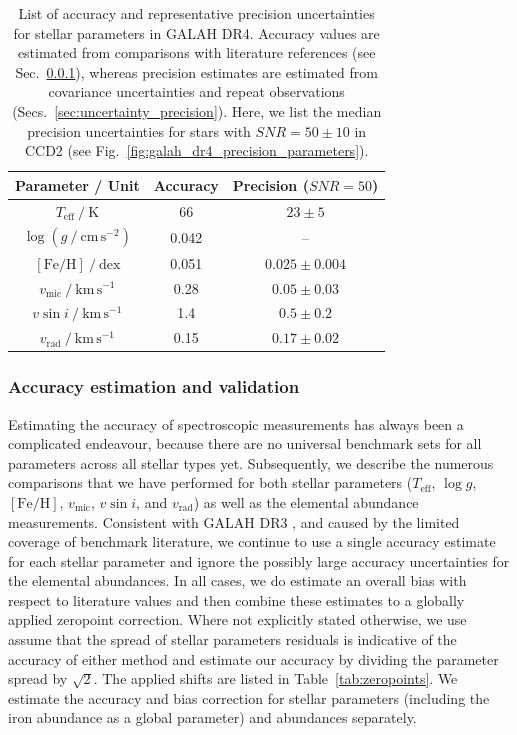\documentclass[
  journal=pasa,
  manuscript=research-paper, %
  year=2024,
  volume=37
]{cup-journal}
\newcommand{\Teff}{$T_\mathrm{eff}$\xspace}
\newcommand{\logg}{$\log g$\xspace}
\newcommand{\feh}{$\mathrm{[Fe/H]}$\xspace}
\newcommand{\vmic}{$v_\mathrm{mic}$\xspace}
\newcommand{\vsini}{$v \sin i$\xspace}
\newcommand{\vrad}{$v_\mathrm{rad}$\xspace}
\begin{document}
\begin{table}[ht]
\centering
\caption{List of accuracy and representative precision uncertainties for stellar parameters in GALAH DR4. Accuracy values are estimated from comparisons with literature references (see Sec.~\ref{sec:uncertainty_accuracy}), whereas precision estimates are estimated from covariance uncertainties and repeat observations (Secs.~\ref{sec:uncertainty_precision}). Here, we list the median precision uncertainties for stars with $SNR = 50 \pm 10$ in CCD2 (see Fig.~\ref{fig:galah_dr4_precision_parameters}).}
\label{tab:accuracy_precision}
\begin{tabular}{ccc}
\hline \hline
Parameter / Unit & Accuracy & Precision ($SNR = 50$)\\
\hline
$T_\text{eff}~/~\mathrm{K}$          & 66     & $23 \pm 5$ \\
$\log (g~/~\mathrm{cm\,s^{-2}})$     &  0.042 & -- \\
$\mathrm{[Fe/H]}~/~\mathrm{dex}$     &  0.051 & $0.025 \pm 0.004$ \\
$v_\text{mic}~/~\mathrm{km\,s^{-1}}$ &  0.28  & $0.05 \pm 0.03$ \\
$v \sin i~/~\mathrm{km\,s^{-1}}$     &  1.4   & $0.5 \pm 0.2$ \\
$v_\text{rad}~/~\mathrm{km\,s^{-1}}$ &  0.15  & $0.17 \pm 0.02$ \\
\hline
\end{tabular}
\end{table}

\subsubsection{Accuracy estimation and validation} \label{sec:uncertainty_accuracy}

Estimating the accuracy of spectroscopic measurements has always been a complicated endeavour, because there are no universal benchmark sets for all parameters across all stellar types yet. Subsequently, we describe the numerous comparisons that we have performed for both stellar parameters (\Teff, \logg, \feh, \vmic, \vsini, and \vrad) as well as the elemental abundance measurements. Consistent with GALAH DR3 \citep{Buder2021}, and caused by the limited coverage of benchmark literature, we continue to use a single accuracy estimate for each stellar parameter and ignore the possibly large accuracy uncertainties for the elemental abundances. In all cases, we do estimate an overall bias with respect to literature values and then combine these estimates to a globally applied zeropoint correction. Where not explicitly stated otherwise, we use assume that the spread of stellar parameters residuals is indicative of the accuracy of either method and estimate our accuracy by dividing the parameter spread by $\sqrt{2}$. The applied shifts are listed in Table~\ref{tab:zeropoints}. We estimate the accuracy and bias correction for stellar parameters (including the iron abundance as a global parameter) and abundances separately.
\end{document}
